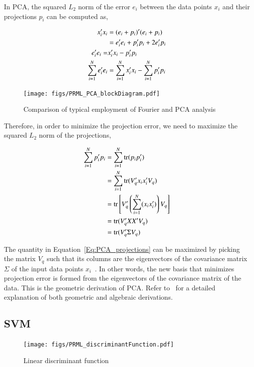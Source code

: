 \begin{Body}
In PCA, the squared $L_2$ norm of the error $e_i$ between the data points $x_i$ and their projections $p_i$ can be computed as,

\begin{align}
x_i'x_i 		&= 	(e_i + p_i)'(e_i + p_i) \notag\\
		&=	e_i'e_i + p_i'p_i + 2e_i'p_i\notag\\
e_i'e_i		=&	x_i'x_i - p_i'p_i\notag\\
\sum\limits_{i=1}^{N}e_i'e_i		&=	\sum\limits_{i=1}^{N}x_i'x_i - \sum\limits_{i=1}^{N}p_i'p_i
\end{align}

\begin{figure}[tp]
\centering
\texttt{[image: figs/PRML\_PCA\_blockDiagram.pdf]}
\caption{Comparison of typical employment of Fourier and PCA analysis}
\label{fig:PCA_Fourier_comparison}
\end{figure}

Therefore, in order to minimize the projection error, we need to maximize the squared $L_2$ norm of the projections,

\begin{align}
\sum\limits_{i=1}^{N} p_i'p_i 				&= \sum\limits_{i=1}^{N} \mbox{tr}(p_ip_i')\notag\\
				&= \sum\limits_{i=1}^{N} \mbox{tr}(V_q'x_ix_i'V_q)\notag\\
				&= \mbox{tr} \left[ V_q' \left(\sum\limits_{i=1}^{N} (x_ix_i')\right) V_q \right]\notag\\
				&= \mbox{tr} (V_q'XX'V_q)\notag\\
				&= \mbox{tr} (V_q'\Sigma V_q)
\label{Eq:PCA_projections}
\end{align}

The quantity in Equation~\ref{Eq:PCA_projections} can be maximized by picking the matrix $V_q$ such that its columns are the eigenvectors of the covariance matrix $\Sigma$ of the input data points $x_i$~\cite{2002_BOOK_PCA_Jolliffe}.  In other words, the new basis that minimizes projection error is formed from the eigenvectors of the covariance matrix of the data.  This is the geometric derivation of PCA.  Refer to~\cite{2002_BOOK_PCA_Jolliffe} for a detailed explanation of both geometric and algebraic derivations.

\subsection{SVM}
								\begin{figure}[tp]
									\center
									\texttt{[image: figs/PRML\_discriminantFunction.pdf]}
									\caption{Linear discriminant function}
									\label{PRML_discriminantFunction}
								\end{figure}


\end{Body}
